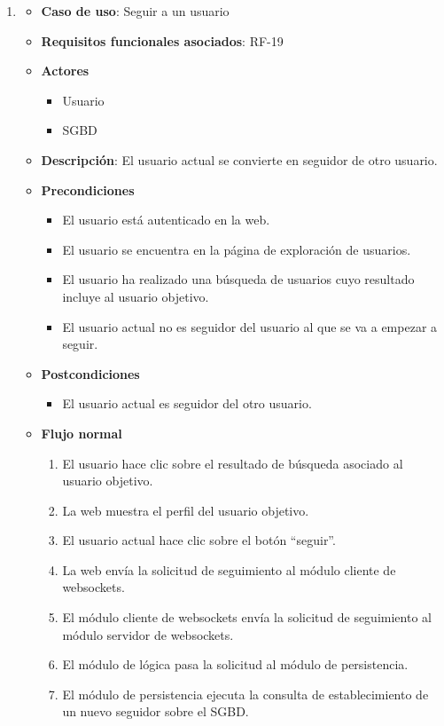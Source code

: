 \begin{enumerate}
\item %
  \begin{itemize}
  \item \textbf{Caso de uso}: Seguir a un usuario
  \item \textbf{Requisitos funcionales asociados}: RF-19
  \item \textbf{Actores}
    \begin{itemize}
    \item Usuario
    \item SGBD
    \end{itemize}
  \item \textbf{Descripción}: El usuario actual se convierte en seguidor de otro usuario.
  \item \textbf{Precondiciones}
    \begin{itemize}
    \item El usuario está autenticado en la web.
    \item El usuario se encuentra en la página de exploración de usuarios.
    \item El usuario ha realizado una búsqueda de usuarios cuyo resultado incluye al usuario objetivo.
    \item El usuario actual no es seguidor del usuario al que se va a empezar a seguir.
    \end{itemize}
  \item \textbf{Postcondiciones}
    \begin{itemize}
    \item El usuario actual es seguidor del otro usuario.
    \end{itemize}
  \item \textbf{Flujo normal}
    \begin{enumerate}
    \item El usuario hace clic sobre el resultado de búsqueda asociado al usuario objetivo.
    \item La web muestra el perfil del usuario objetivo.
    \item El usuario actual hace clic sobre el botón ``seguir''.
    \item La web envía la solicitud de seguimiento al módulo cliente de websockets.
    \item El módulo cliente de websockets envía la solicitud de seguimiento al módulo servidor de websockets.
    \item El módulo de lógica pasa la solicitud al módulo de persistencia.
    \item El módulo de persistencia ejecuta la consulta de establecimiento de un nuevo seguidor sobre el SGBD.

\end{enumerate}
\end{itemize}
\end{enumerate}
